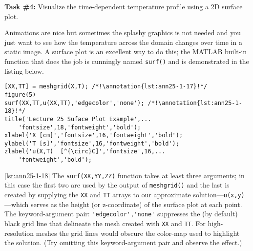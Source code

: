 \vspace{0.25cm}
\setcounter{lstannotation}{0} %
\noindent\textbf{Task \#4: } Visualize the time-dependent temperature profile using a 2D surface plot.

\vspace{0.15cm}

\noindent Animations are nice but sometimes the splashy graphics is not needed and you just want to see how the temperature across the domain changes over time in a static image.  A surface plot is an excellent way to do this; the MATLAB built-in function that does the job is cunningly named \lstinline[style=myMatlab]{surf()} and is demonstrated in the listing below.
\begin{lstlisting}[style=myMatlab, name=lec25-ex1]
%% Plot the temperature vs time in a 2D plot using the surf function
[XX,TT] = meshgrid(X,T); /*!\annotation{lst:ann25-1-17}!*/
figure(5)
surf(XX,TT,u(XX,TT),'edgecolor','none'); /*!\annotation{lst:ann25-1-18}!*/
title('Lecture 25 Suface Plot Example',...
    'fontsize',18,'fontweight','bold');
xlabel('X [cm]','fontsize',16,'fontweight','bold');
ylabel('T [s]','fontsize',16,'fontweight','bold');
zlabel('u(X,T)  [^{\circ}C]','fontsize',16,...
    'fontweight','bold');
\end{lstlisting}

\vspace{0.2cm}

\ref{lst:ann25-1-18} The \lstinline[style=myMatlab]{surf(XX,YY,ZZ)} function takes at least three arguments; in this case the first two are used by the output of \lstinline[style=myMatlab]{meshgrid()} and the last is created by supplying the \lstinline{XX} and \lstinline{TT} arrays to our approximate solution---\lstinline{u(x,y)}---which serves as the height (or z-coordinate) of the surface plot at each point.  The keyword-argument pair: \lstinline{'edgecolor','none'} suppresses the (by default) black grid line that delineate the mesh created with \lstinline{XX} and \lstinline{TT}.  For high-resolution meshes the grid lines would obscure the color-map used to highlight the solution. (Try omitting this keyword-argument pair and observe the effect.)

